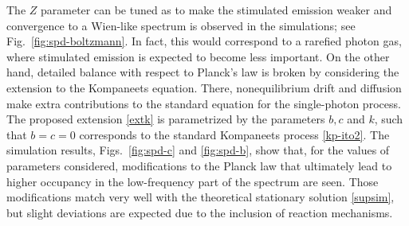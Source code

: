 \documentclass[a4paper,12pt,reqno,superscriptaddress,nofootinbib]{revtex4}
\theoremstyle{plain}
\theoremstyle{definition}
\theoremstyle{remark}
\newcommand{\0}{^{(0)}}
\newcommand{\1}{^{(1)}}
\newcommand{\2}{^{(2)}}
\begin{document}
The $Z$ parameter can be tuned as to make the stimulated emission weaker and 
convergence to a Wien-like spectrum is observed in the simulations; see 
Fig.~\ref{fig:spd-boltzmann}. In fact, this would correspond to a rarefied 
photon gas, where stimulated emission is expected to become less important. On 
the other hand, detailed balance with respect to Planck's law is broken by 
considering the extension to the Kompaneets equation. There, nonequilibrium 
drift and diffusion make extra contributions to the standard equation for the 
single-photon process. The proposed extension \eqref{extk} is parametrized by 
the parameters $b,c$ and $k$, such that $b=c=0$ corresponds to the standard 
Kompaneets process \eqref{kp-ito2}. The simulation results, 
Figs.~\ref{fig:spd-c} and \ref{fig:spd-b}, show that, for the values of 
parameters considered, modifications to the Planck law that ultimately lead to 
higher occupancy in the low-frequency part of the spectrum are seen. Those 
modifications match very well with the theoretical stationary solution 
\eqref{supsim}, but slight deviations are expected due to the inclusion of 
reaction mechanisms.


 
\end{document}
